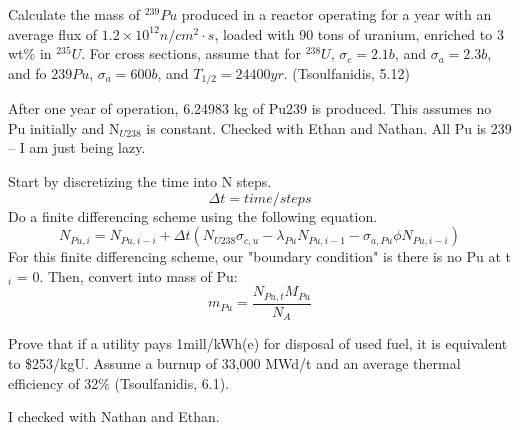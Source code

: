 \documentclass[11pt,answers,addpoints]{exam}
\begin{document}
\begin{questions}
        \question[20] Calculate the mass of $^{239}Pu$ produced in a reactor 
        operating for a year with an average flux of $1.2\times 
        10^{12}n/cm^2\cdot s$, loaded with 90 tons of uranium, enriched to 3 
        wt\% in $^{235}U$. For cross sections, assume that for $^{238}U$, 
        $\sigma_c=2.1b$, and $\sigma_a  = 2.3b$, and fo ${239}Pu$, 
        $\sigma_a=600b$, and $T_{1/2} = 24400yr$. (Tsoulfanidis, 5.12)

        \begin{solution}
        After one year of operation, 6.24983 kg of Pu239 is produced. This assumes no Pu initially and N$_{U238}$ is constant. Checked with Ethan and Nathan. All Pu is 239 -- I am just being lazy.

        Start by discretizing the time into N steps.
        \begin{equation}
            \Delta t = time / steps
        \end{equation}
        Do a finite differencing scheme using the following equation.
        \begin{equation}
            N_{Pu, i} = N_{Pu, i - i} + 
            \Delta t \left( N_{U238} \sigma_{c,u}
            - \lambda_{Pu} N_{Pu, i - 1}
            - \sigma_{a,Pu} \phi N_{Pu, i - i} \right)
        \end{equation}
        For this finite differencing scheme, our "boundary condition" is there is no Pu at t$_i$ = 0. Then, convert into mass of Pu:
        \begin{equation}
            m_{Pu} = \frac{N_{Pu, t} M_{Pu}}{N_A}
        \end{equation}

        \end{solution}

        \question[15] Prove that if a utility pays 1mill/kWh(e) for disposal of 
        used fuel, it is equivalent to \$253/kgU. Assume a burnup of 33,000 
        MWd/t and an average thermal efficiency of 32\% (Tsoulfanidis, 6.1).
        \begin{solution}
        I checked with Nathan and Ethan.
        

\end{solution}
\end{questions}
\end{document}
